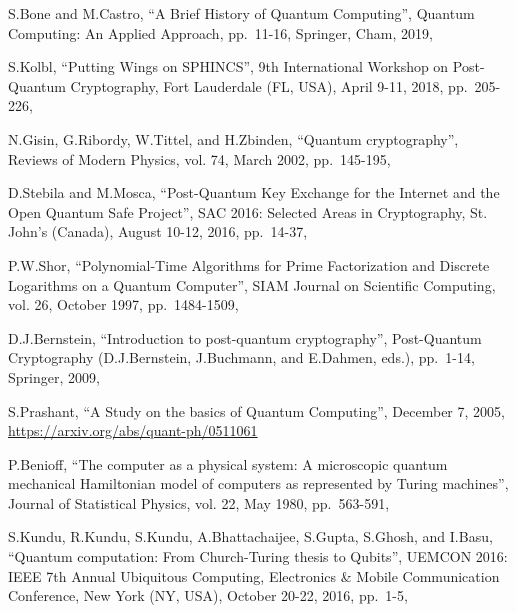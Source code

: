 \documentclass[a4paper,12pt]{article}
\begin{document}
\begin{thebibliography}{99}
%
%

S.Bone and M.Castro,
``A Brief History of Quantum Computing'',
Quantum Computing: An Applied Approach,
pp.~11-16,
Springer, Cham,
2019,

S.Kolbl,
``Putting Wings on SPHINCS'',
9th International Workshop on Post-Quantum Cryptography,
Fort Lauderdale (FL, USA),
April 9-11, 2018,
pp.~205-226,

N.Gisin, G.Ribordy, W.Tittel, and H.Zbinden,
``Quantum cryptography'',
Reviews of Modern Physics,
vol. 74,
March 2002,
pp.~145-195,

D.Stebila and M.Mosca,
``Post-Quantum Key Exchange for the Internet and the Open Quantum Safe Project'',
SAC 2016: Selected Areas in Cryptography,
St. John's (Canada),
August 10-12, 2016,
pp.~14-37,

P.W.Shor,
``Polynomial-Time Algorithms for Prime Factorization and Discrete Logarithms on a Quantum Computer'',
SIAM Journal on Scientific Computing,
vol. 26,
October 1997,
pp.~1484-1509,

D.J.Bernstein,
``Introduction to post-quantum cryptography'',
Post-Quantum Cryptography (D.J.Bernstein, J.Buchmann, and E.Dahmen, eds.),
pp.~1-14,
Springer,
2009,

S.Prashant,
``A Study on the basics of Quantum Computing'',
December 7, 2005,
\url{https://arxiv.org/abs/quant-ph/0511061}

P.Benioff,
``The computer as a physical system: A microscopic quantum mechanical Hamiltonian model of computers as represented by Turing machines'',
Journal of Statistical Physics,
vol. 22,
May 1980,
pp.~563-591,

S.Kundu, R.Kundu, S.Kundu, A.Bhattachaijee, S.Gupta, S.Ghosh, and I.Basu,
``Quantum computation: From Church-Turing thesis to Qubits'',
UEMCON 2016: IEEE 7th Annual Ubiquitous Computing, Electronics \& Mobile Communication Conference,
New York (NY, USA),
October 20-22, 2016,
pp.~1-5,


\end{thebibliography}
\end{document}
